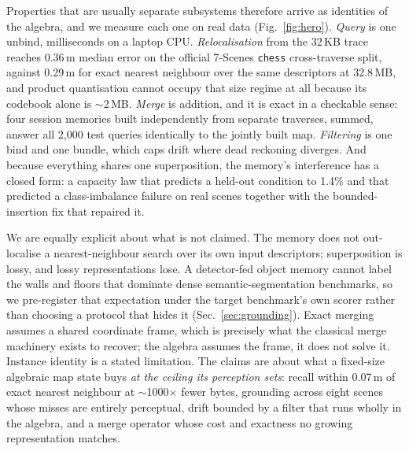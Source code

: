 \documentclass[conference]{IEEEtran}
\begin{document}
Properties that are usually separate subsystems therefore arrive as
identities of the algebra, and we measure each one on real data
(Fig.~\ref{fig:hero}). \emph{Query} is one unbind, milliseconds on a
laptop CPU.
\emph{Relocalisation} from the 32\,KB trace reaches 0.36\,m median error
on the official 7-Scenes \texttt{chess} cross-traverse split, against
0.29\,m for exact nearest neighbour over the same descriptors at
32.8\,MB, and product quantisation cannot occupy that size regime at all
because its codebook alone is $\sim$2\,MB. \emph{Merge} is addition, and
it is exact in a checkable sense: four session memories built
independently from separate traverses, summed, answer all 2{,}000 test
queries identically to the jointly built map. \emph{Filtering} is one
bind and one bundle, which caps drift where dead reckoning diverges. And
because everything shares one superposition, the memory's interference
has a closed form: a capacity law that predicts a held-out condition to
1.4\% and that predicted a class-imbalance failure on real scenes
together with the bounded-insertion fix that repaired it.

We are equally explicit about what is not claimed. The memory does not
out-localise a nearest-neighbour search over its own input descriptors;
superposition is lossy, and lossy representations lose. A detector-fed
object memory cannot label the walls and floors that dominate dense
semantic-segmentation benchmarks, so we pre-register that expectation
under the target benchmark's own scorer rather than choosing a protocol
that hides it (Sec.~\ref{sec:grounding}). Exact merging assumes a shared
coordinate frame, which is precisely what the classical merge machinery
exists to recover; the algebra assumes the frame, it does not solve it.
Instance identity is a stated limitation. The claims are about what a
fixed-size algebraic map state buys \emph{at the ceiling its perception
sets}: recall within 0.07\,m of exact nearest neighbour at
$\sim$1000$\times$ fewer bytes, grounding across eight scenes whose
misses are entirely perceptual, drift bounded by a filter that runs
wholly in the algebra, and a merge operator whose cost and exactness no
growing representation matches.
\end{document}
